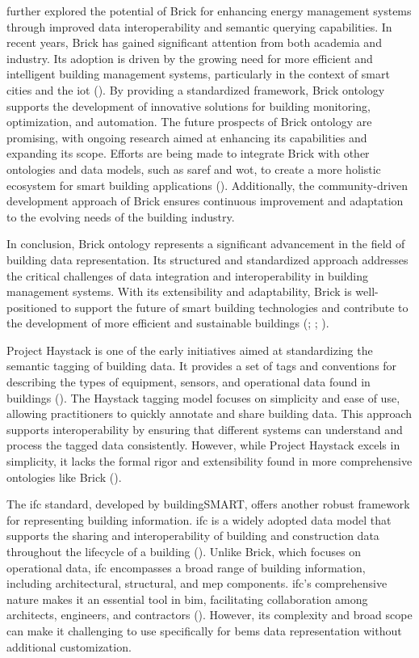 \cite{Balaji2018} further explored the potential of Brick for enhancing energy management systems through improved data interoperability and semantic querying capabilities.
In recent years, Brick has gained significant attention from both academia and industry.
Its adoption is driven by the growing need for more efficient and intelligent building management systems, particularly in the context of smart cities and the \gls{iot} (\cite{Balaji2016}).
By providing a standardized framework, Brick ontology supports the development of innovative solutions for building monitoring, optimization, and automation.
The future prospects of Brick ontology are promising, with ongoing research aimed at enhancing its capabilities and expanding its scope.
Efforts are being made to integrate Brick with other ontologies and data models, such as \gls{saref} and \gls{wot}, to create a more holistic ecosystem for smart building applications (\cite{Balaji2018}).
Additionally, the community-driven development approach of Brick ensures continuous improvement and adaptation to the evolving needs of the building industry.

In conclusion, Brick ontology represents a significant advancement in the field of building data representation.
Its structured and standardized approach addresses the critical challenges of data integration and interoperability in building management systems.
With its extensibility and adaptability, Brick is well-positioned to support the future of smart building technologies and contribute to the development of more efficient and sustainable buildings (\cite{Agarwal2012}; \cite{Balaji2016}; \cite{Balaji2018}).

Project Haystack is one of the early initiatives aimed at standardizing the semantic tagging of building data.
It provides a set of tags and conventions for describing the types of equipment, sensors, and operational data found in buildings (\cite{projecthaystack}).
The Haystack tagging model focuses on simplicity and ease of use, allowing practitioners to quickly annotate and share building data.
This approach supports interoperability by ensuring that different systems can understand and process the tagged data consistently.
However, while Project Haystack excels in simplicity, it lacks the formal rigor and extensibility found in more comprehensive ontologies like Brick (\cite{projecthaystack}).

The \gls{ifc} standard, developed by buildingSMART, offers another robust framework for representing building information.
\gls{ifc} is a widely adopted data model that supports the sharing and interoperability of building and construction data throughout the lifecycle of a building (\cite{Liu2021}).
Unlike Brick, which focuses on operational data, \gls{ifc} encompasses a broad range of building information, including architectural, structural, and \gls{mep} components.
\gls{ifc}'s comprehensive nature makes it an essential tool in \gls{bim}, facilitating collaboration among architects, engineers, and contractors (\cite{Liu2021}).
However, its complexity and broad scope can make it challenging to use specifically for \gls{bems} data representation without additional customization.

